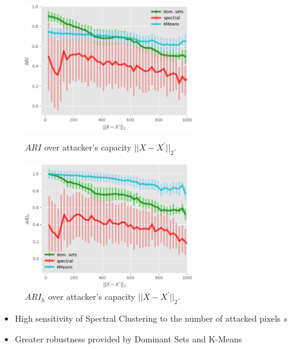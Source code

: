 \documentclass{beamer}
\begin{document}
\begin{frame}
\begin{figure}[H]
	\begin{minipage}[t]{0.45\linewidth}
		\centering
		\includegraphics[width=0.65\textwidth]{img/advpixel/X2_ARI.png}
		\caption{\footnotesize $ARI$ over attacker's capacity $\vert \vert X - X^\prime\vert \vert_2$.}
	\end{minipage}        
	\hspace{.1cm}
	\begin{minipage}[t]{0.45\linewidth}
		\centering
		\includegraphics[width=0.65\textwidth]{img/advpixel/X2_ARIh.png}
		\caption{\footnotesize $ARI_h$ over attacker's capacity $\vert \vert X - X^\prime\vert \vert_2$.}
	\end{minipage}
\end{figure}
\changefontsizes{7.8pt}
\begin{itemize}
	\item High sensitivity of Spectral Clustering to the number of attacked pixels $s$
	\item Greater robustness provided by Dominant Sets and K-Means
\end{itemize}
\end{frame}
\end{document}
